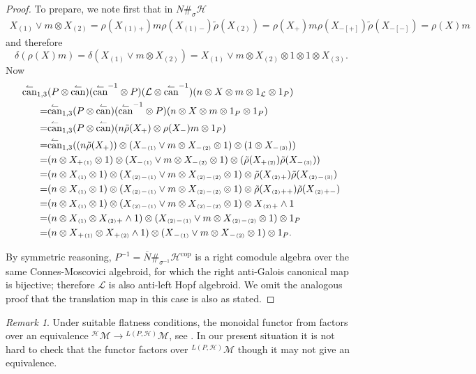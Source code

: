\documentclass[a4paper,reqno]{amsart}
\numberwithin{equation}{section}
\theoremstyle{plain}
\theoremstyle{remark}
\newtheorem{rem}[thm]{Remark}
\numberwithin{equation}{section}
\newcommand\inv{^{-1}}
\newcommand{\ot}{\otimes}
\newcommand\ol{\overline}
\newcommand{\cL}{\mathcal{L}}
\newcommand{\lcan}{\overset\leftharpoonup\can}
\newcommand{\trho}{{\tilde{\rho}}}
\renewcommand{\o}{{}_{\scriptscriptstyle{(1)}}}
\renewcommand{\t}{{}_{\scriptscriptstyle{(2)}}}
\renewcommand{\th}{{}_{\scriptscriptstyle{(3)}}}
\newcommand{\CH}{\mathcal{H}}
\newcommand{\CL}{\mathcal{L}}
\newcommand{\can}{{\rm can}}
\newcommand\LComod[1]{{^{#1}}\mathcal M}
\newcommand\cop{{\operatorname{cop}}}
\begin{document}
\begin{proof}
To prepare, we note first that in $N\#_\sigma \CH$
\begin{multline*}
    X\o\vee m\ot X\t=\rho(X\o{}_{+})m\rho(X\o{}_{-})\trho(X\t)=\rho(X_+)m\rho(X_{-[+]})\trho(X_{-[-]})=\rho(X)m
\end{multline*}
and therefore
\[\delta(\rho(X)m)=\delta(X\o\vee m\ot X\t)=X\o\vee m\ot X\t\ot 1\ot 1\ot X\th.\]
Now
\begin{align*}
     \lcan_{1,3}&(P\ot\lcan)(\lcan\inv\ot P)(\CL\ot\lcan\inv)(n\ot X\ot m\ot 1_\CL\ot 1_P)
    \\
    =&\lcan_{1,3}(P\ot\lcan)(\lcan\inv\ot P)(n\ot X\ot m\ot 1_P\ot 1_P)
    \\
    =&\lcan_{1,3}(P\ot\lcan)(n\trho(X_+)\ot\rho(X_-)m\ot 1_P)
    \\
    =&\lcan_{1,3}((n\trho(X_+))\ot ( X_{-}\o\vee m\ot X_{-}\t\ot 1)\ot (1\ot X_{-}\th))
    \\
    =&(n\ot X_+\o\ot 1)\ot (X_-\o\vee m\ot X_-\t\ot 1)\ot (\trho(X_+\t)\trho(X_-\th))
    \\
    =&(n\ot X\o\ot 1)\ot (X\t{}_{-}\o\vee m\ot X\t{}_{-}\t\ot 1)\ot \trho(X\t{}_{+})\trho(X\t{}_{-}\th)
     \\
     =&(n\ot X\o\ot 1)\ot (X\t{}_{-}\o\vee m\ot X\t{}_{-}\t\ot 1)\ot \trho(X\t{}_{++})\trho(X\t{}_{+-})
      \\
      =&(n\ot X\o\ot 1)\ot (X\t{}_{-}\o\vee m\ot X\t{}_{-}\t\ot 1)\ot X\t{}_{+}\wedge 1
       \\
       =&(n\ot X\o\ot X\t{}_{+}\wedge 1)\ot (X\t{}_{-}\o\vee m\ot X\t{}_{-}\t\ot 1)\ot 1_P
       \\
       =&(n\ot X{}_{+}\o\ot X{}_{+}\t\wedge 1)\ot (X{}_{-}\o\vee m\ot X{}_{-}\t\ot 1)\ot 1_P.
\end{align*}

    By symmetric reasoning, $P\inv=\ol N\#_{\sigma\inv}\CH^{\cop}$ is a right comodule algebra over the same Connes-Moscovici algebroid, for which the right anti-Galois canonical map is bijective; therefore $\cL$ is also anti-left Hopf algebroid. We omit the analogous proof that the translation map in this case is also as stated.
    \end{proof}
    \begin{rem}
    Under suitable flatness conditions, 
    the monoidal functor from  factors over an equivalence $\LComod\CH\to\LComod{L(P,\CH)}$, see . In our present situation it is not hard to check that the functor factors over $\LComod{L(P,\CH)}$ though it may not give an equivalence.
    \end{rem}
\end{document}
